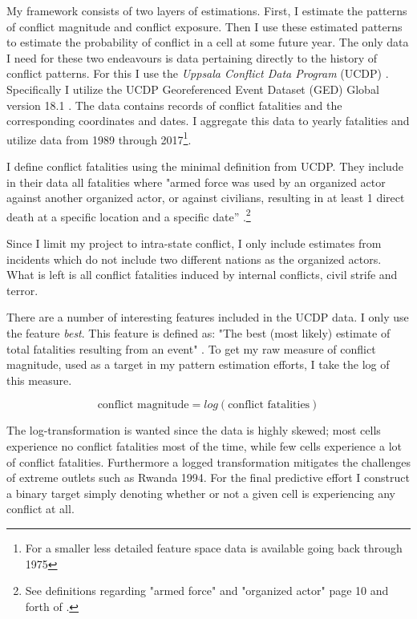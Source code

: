 \documentclass[a4paper]{article}
\begin{document}
My framework consists of two layers of estimations. First, I estimate the patterns of conflict magnitude and conflict exposure. Then I use these estimated patterns to estimate the probability of conflict in a cell at some future year. The only data I need for these two endeavours is data pertaining directly to the history of conflict patterns. For this I use the \emph{Uppsala Conflict Data Program} (UCDP) \citep{Sundberg_2013, Croicu_Sundberg_2017}. Specifically I utilize the UCDP Georeferenced Event Dataset (GED) Global version 18.1 \citep{UCDP_2017}. The data contains records of conflict fatalities and the corresponding coordinates and dates. I aggregate this data to yearly fatalities and utilize data from 1989 through 2017\footnote{For a smaller less detailed feature space data is available going back through 1975}.\par 

I define conflict fatalities using the minimal definition from UCDP. They include in their data all fatalities where "armed force was used by an organized actor against another organized actor, or against civilians, resulting in at least 1 direct death at a specific location and a specific date” \cite[9]{Croicu_Sundberg_2017}.\footnote{See definitions regarding "armed force" and "organized actor" page 10 and forth of \cite{Croicu_Sundberg_2017}.}\par 

Since I limit my project to intra-state conflict, I only include estimates from incidents which do not include two different nations as the organized actors. What is left is all conflict fatalities induced by internal conflicts, civil strife and terror.\par

There are a number of interesting features included in the UCDP data. I only use the feature \emph{best}. This feature is defined as: "The best (most likely) estimate of total fatalities resulting from an event" \cite[7]{Croicu_Sundberg_2017}. To get my raw measure of conflict magnitude, used as a target in my pattern estimation efforts, I take the log of this measure.\par

\[
\text{conflict magnitude} = log(\text{conflict fatalities}) \tag{18} \label{eq:cm}
\]

The log-transformation is wanted since the data is highly skewed; most cells experience no conflict fatalities most of the time, while few cells experience a lot of conflict fatalities. Furthermore a logged transformation mitigates the challenges of extreme outlets such as Rwanda 1994. For the final predictive effort I construct a binary target simply denoting whether or not a given cell is experiencing any conflict at all.\par
\end{document}

